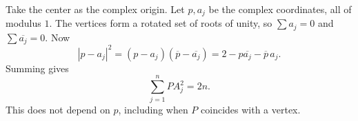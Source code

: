 Take the center as the complex origin. Let $p,a_j$ be the complex coordinates, all of modulus $1$. The vertices form a rotated set of roots of unity, so $\sum a_j=0$ and $\sum\overline{a_j}=0$. Now
\[
|p-a_j|^2=(p-a_j)(\overline p-\overline{a_j})
=2-p\overline{a_j}-\overline p\,a_j.
\]
Summing gives
\[
\boxed{\sum_{j=1}^nPA_j^2=2n}.
\]
This does not depend on $p$, including when $P$ coincides with a vertex.
